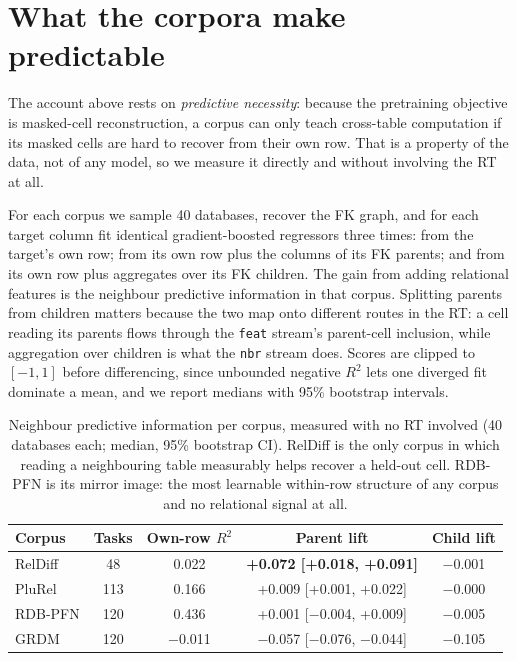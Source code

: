 
\section{What the corpora make predictable}
\label{sec:corpus}

The account above rests on \emph{predictive necessity}: because the pretraining objective is
masked-cell reconstruction, a corpus can only teach cross-table computation if its masked cells
are hard to recover from their own row. That is a property of the data, not of any model, so we
measure it directly and without involving the RT at all.

For each corpus we sample 40 databases, recover the FK graph, and for each target column fit
identical gradient-boosted regressors three times: from the target's own row; from its own row
plus the columns of its FK parents; and from its own row plus aggregates over its FK children.
The gain from adding relational features is the neighbour predictive information in that corpus.
Splitting parents from children matters because the two map onto different routes in the RT: a
cell reading its parents flows through the \texttt{feat} stream's parent-cell inclusion, while
aggregation over children is what the \texttt{nbr} stream does. Scores are clipped to $[-1,1]$
before differencing, since unbounded negative $R^2$ lets one diverged fit dominate a mean, and we
report medians with 95\% bootstrap intervals.

\begin{table}[t]
\caption{Neighbour predictive information per corpus, measured with no RT involved (40 databases
each; median, 95\% bootstrap CI). RelDiff is the only corpus in which reading a neighbouring table
measurably helps recover a held-out cell. RDB-PFN is its mirror image: the most learnable
within-row structure of any corpus and no relational signal at all.}
\label{tab:e2}
\centering
\small
\begin{tabular}{lcccc}
\toprule
Corpus & Tasks & Own-row $R^2$ & Parent lift & Child lift \\
\midrule
RelDiff & 48  & 0.022 & \textbf{+0.072 [+0.018, +0.091]} & $-$0.001 \\
PluRel  & 113 & 0.166 & +0.009 [+0.001, +0.022] & $-$0.000 \\
RDB-PFN & 120 & 0.436 & +0.001 [$-$0.004, +0.009] & $-$0.005 \\
GRDM    & 120 & $-$0.011 & $-$0.057 [$-$0.076, $-$0.044] & $-$0.105 \\
\bottomrule
\end{tabular}
\end{table}

